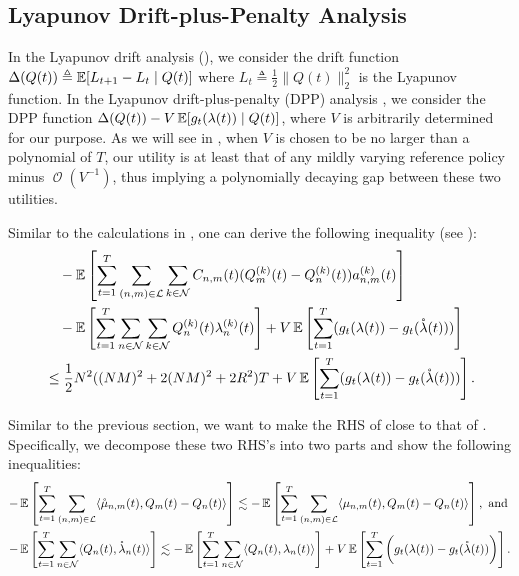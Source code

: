\documentclass[11pt,fullpage,letterpaper]{article} %
\renewcommand{\bm}[1]{#1}%
\renewcommand{\O}{\operatorname{\mathcal O}}
\newcommand{\E}{\operatornamewithlimits{\mathbb{E}}}
\newcommand{\mN}{{\mathcal N}}
\newcommand{\mL}{{\mathcal L}}
\newcommand\scalemath[2]{\scalebox{#1}{\mbox{\ensuremath{\displaystyle #2}}}}
\begin{document}
\subsection{Lyapunov Drift-plus-Penalty Analysis}\label{sec:multi-hop utility Lyapunov}
In the Lyapunov drift analysis (), we consider the drift function $\Delta(\bm Q(t))\triangleq \E[L_{t+1}-L_t \mid \bm Q(t)]$ where $L_t\triangleq \frac 12 \lVert \bm Q(t)\rVert_2^2$ is the Lyapunov function.
In the Lyapunov drift-plus-penalty (DPP) analysis \citep[Theorem 4.2]{neely2010stochastic}, we consider the DPP function $\Delta(\bm Q(t))-V\E[g_t(\bm \lambda(t)) \mid \bm Q(t)]$, where $V$ is arbitrarily determined for our purpose.
As we will see in , when $V$ is chosen to be no larger than a polynomial of $T$, our utility is at least that of any mildly varying reference policy minus $\O(V^{-1})$, thus implying a polynomially decaying gap between these two utilities.

Similar to the calculations in , one can derive the following inequality (see ):
\begin{align}
&\quad -\E\left [\sum_{t=1}^T \sum_{(n,m)\in \mL} \sum_{k\in \mN} C_{n,m}(t) (Q_m^{(k)}(t)-Q_n^{(k)}(t))a_{n,m}^{(k)}(t)\right ] \nonumber\\
&\quad -\E\left [\sum_{t=1}^T \sum_{n\in \mN} \sum_{k\in \mN} Q_n^{(k)}(t) \lambda_n^{(k)}(t)\right ]+V \E\left [\sum_{t=1}^T (g_t(\bm \lambda(t))-g_t(\mathring{\bm \lambda}(t)))\right ] \nonumber\\
&\le \frac 12 N^2 ((NM)^2+2(NM)^2+2R^2) T+V  \E\left [\sum_{t=1}^T (g_t(\bm \lambda(t))-g_t(\mathring{\bm \lambda}(t)))\right ].\label{eq:multi-hop utility Lyapunov}
\end{align}

Similar to the previous section, we want to make the RHS of  close to that of .
Specifically, we decompose these two RHS's into two parts and show the following inequalities:
\begin{align}
&\scalemath{0.95}{-\E\left [\sum_{t=1}^T \sum_{(n,m)\in \mL}\langle \mathring {\bm \mu}_{n,m}(t), \bm Q_m(t) - \bm Q_n(t)\rangle\right ]\lesssim -\E\left [\sum_{t=1}^T \sum_{(n,m)\in \mL} \langle \bm \mu_{n,m}(t), \bm Q_m(t)-\bm Q_n(t)\rangle\right ],~ \text{and}} \nonumber\\
&\scalemath{0.95}{- \E\left [\sum_{t=1}^T \sum_{n\in \mN} \langle \bm Q_n(t), \mathring {\bm \lambda}_n(t)\rangle\right ]\lesssim -\E\left [\sum_{t=1}^T \sum_{n\in \mN} \langle \bm Q_n(t), \bm \lambda_n(t)\rangle\right ]+V \E\left [\sum_{t=1}^T \bigg (g_t(\bm \lambda(t))-g_t(\mathring{\bm \lambda}(t))\bigg )\right ].} \label{eq:multi-hop utility BCO objective}
\end{align}
\end{document}
